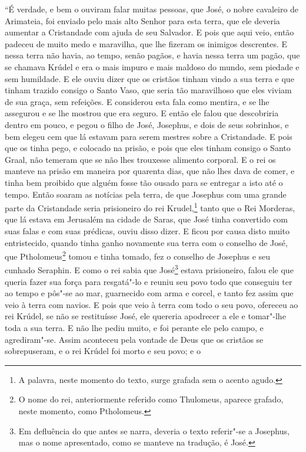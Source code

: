 “É verdade, e bem o ouviram falar muitas pessoas, que José, o nobre
cavaleiro de Arimateia, foi enviado pelo mais alto Senhor para esta terra, que
ele deveria aumentar a Cristandade com ajuda de seu Salvador. E pois que aqui
veio, então padeceu de muito medo e maravilha, que lhe fizeram os inimigos
descrentes. E nessa terra não havia, ao tempo, senão pagãos, e havia nessa
terra um pagão, que se chamava Krúdel e era o mais impuro e mais maldoso do
mundo, sem piedade e sem humildade. E ele ouviu dizer que os cristãos
tinham vindo a sua terra e que tinham trazido consigo o Santo Vaso, que seria
tão maravilhoso que eles viviam de sua graça, sem refeições. E considerou esta
fala como mentira, e se lhe assegurou e se lhe mostrou que era seguro. E então
ele falou que descobriria dentro em pouco, e pegou o filho de José, Josephus, e
dois de seus sobrinhos, e bem elegeu cem que lá estavam para serem mestres
sobre a Cristandade. E pois que os tinha pego, e colocado na prisão, e pois que
eles tinham consigo o Santo Graal, não temeram que se não lhes trouxesse
alimento corporal. E o rei os manteve na prisão em maneira por quarenta dias,
que não lhes dava de comer, e tinha bem proibido que alguém fosse tão ousado
para se entregar a isto até o tempo. Então soaram as notícias pela terra, de
que Josephus com uma grande parte da Cristandade seria prisioneiro do rei
Krudel,\footnote{ A palavra, neste momento do texto, surge grafada sem o acento
agudo.}  tanto que o Rei Morderas,  que lá estava em Jerusalém na
cidade de Saras, que José tinha convertido com suas falas e com suas prédicas,
ouviu disso dizer. E ficou por causa disto muito entristecido, quando tinha
ganho novamente sua terra com o conselho de José, que Ptholomeus\footnote{ O
nome do rei, anteriormente referido como Thulomeus, aparece grafado, neste
momento, como Ptholomeus.}  tomou e tinha tomado, fez o conselho de
Josephus e seu cunhado Seraphin. E como o rei sabia que José\footnote{ Em
defluência do que antes se narra, deveria o texto referir"-se a Josephus, mas o
nome apresentado, como se manteve na tradução, é José.}  estava
prisioneiro, falou ele que queria fazer sua força para resgatá"-lo e reuniu seu
povo todo que conseguiu ter ao tempo e pôs"-se ao mar, guarnecido com arma e
corcel, e tanto fez assim que veio à terra com navios. E pois que veio à terra
com todo o seu povo, ofereceu ao rei Krúdel, se não se restituísse José, ele
quereria apodrecer a ele e tomar"-lhe toda a sua terra. E não lhe pediu muito, e
foi perante ele pelo campo, e agrediram"-se. Assim aconteceu pela vontade de
Deus que os cristãos se sobrepuseram, e o rei Krúdel foi morto e seu povo; e o
